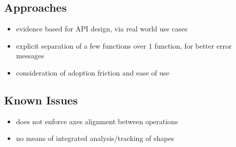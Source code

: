 \documentclass[8pt,letter]{article}
\begin{document}
\begin{multicols*}{2}
  \subsection{Approaches}
  
  \begin{itemize}
  \item evidence based for API design, via real world use cases
  \item explicit separation of a few functions over 1 function, for better error messages
  \item consideration of adoption friction and ease of use
  \end{itemize}

  \vfill\null
  \columnbreak
    
  \subsection{Known Issues}
  \begin{itemize}
  \item does not enforce axes alignment between operations
  \item no means of integrated analysis/tracking of shapes
  \end{itemize}
  
  \vfill\null
  \pagebreak
  
\end{multicols*}
\end{document}
